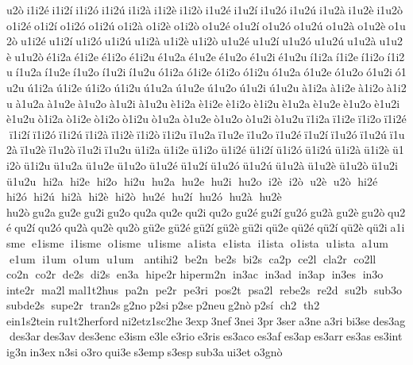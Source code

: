 u2ò i1i2é i1i2í i1i2ó i1i2ú i1i2à i1i2è i1i2ò i1u2é i1u2í i1u2ó i1u2ú i1u2à i1u2è i1u2ò o1i2é o1i2í o1i2ó o1i2ú o1i2à o1i2è o1i2ò o1u2é o1u2í o1u2ó o1u2ú o1u2à o1u2è o1u2ò u1i2é u1i2í u1i2ó u1i2ú u1i2à u1i2è u1i2ò u1u2é u1u2í u1u2ó u1u2ú u1u2à u1u2è u1u2ò é1i2a é1i2e é1i2o é1i2u é1u2a é1u2e é1u2o é1u2i é1u2u í1i2a í1i2e í1i2o í1i2u í1u2a í1u2e í1u2o í1u2i í1u2u ó1i2a ó1i2e ó1i2o ó1i2u ó1u2a ó1u2e ó1u2o ó1u2i ó1u2u ú1i2a ú1i2e ú1i2o ú1i2u ú1u2a ú1u2e ú1u2o ú1u2i ú1u2u à1i2a à1i2e à1i2o à1i2u à1u2a à1u2e à1u2o à1u2i à1u2u è1i2a è1i2e è1i2o è1i2u è1u2a è1u2e è1u2o è1u2i è1u2u ò1i2a ò1i2e ò1i2o ò1i2u ò1u2a ò1u2e ò1u2o ò1u2i ò1u2u ï1i2a ï1i2e ï1i2o ï1i2é ï1i2í ï1i2ó ï1i2ú ï1i2à ï1i2è ï1i2ò ï1i2u ï1u2a ï1u2e ï1u2o ï1u2é ï1u2í ï1u2ó ï1u2ú ï1u2à ï1u2è ï1u2ò ï1u2i ï1u2u ü1i2a ü1i2e ü1i2o ü1i2é ü1i2í ü1i2ó ü1i2ú ü1i2à ü1i2è ü1i2ò ü1i2u ü1u2a ü1u2e ü1u2o ü1u2é ü1u2í ü1u2ó ü1u2ú ü1u2à ü1u2è ü1u2ò ü1u2i ü1u2u  hi2a  hi2e  hi2o  hi2u  hu2a  hu2e  hu2i  hu2o  i2è  i2ò  u2è  u2ò  hi2é  hi2ó  hi2ú  hi2à  hi2è  hi2ò  hu2é  hu2í  hu2ó  hu2à  hu2è  hu2ò gu2a gu2e gu2i gu2o qu2a qu2e qu2i qu2o gu2é gu2í gu2ó gu2à gu2è gu2ò qu2é qu2í qu2ó qu2à qu2è qu2ò gü2e gü2é gü2í gü2è gü2i qü2e qü2é qü2í qü2è qü2i a1isme  e1isme  i1isme  o1isme  u1isme  a1ista  e1ista  i1ista  o1ista  u1ista  a1um  e1um  i1um  o1um  u1um   antihi2  be2n  be2s  bi2s  ca2p  ce2l  cla2r  co2ll  co2n  co2r  de2s  di2s  en3a  hipe2r 	 hiperm2n  in3ac  in3ad  in3ap  in3es  in3o  inte2r  ma2l 
 mal1t2hus  pa2n  pe2r  pe3ri  pos2t  psa2l  rebe2s  re2d  su2b  sub3o  subde2s  supe2r  tran2s g2no p2si p2se p2neu g2nò p2sí  ch2  th2 
ein1s2tein ru1t2herford ni2etz1sc2he 3exp 3nef 3nei 3pr 3ser a3ne a3ri bi3se des3ag des3ar des3av des3enc e3ism e3le e3rio e3ris es3aco es3af es3ap es3arr es3as es3int ig3n in3ex n3si o3ro qui3e s3emp s3esp sub3a ui3et o3gnò